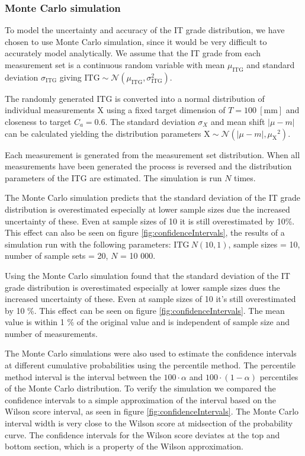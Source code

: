 \documentclass[aip,amsmath, reprint, author-year]{revtex4-1}
\begin{document}
\subsubsection{Monte Carlo simulation}
To model the uncertainty and accuracy of the IT grade distribution, we have chosen to use Monte Carlo simulation, since it would be very difficult to accurately model analytically. We assume that the IT grade from each measurement set is a continuous random variable with mean $\mu_{\mathrm{ITG}}$ and standard deviation $\sigma_{\mathrm{ITG}}$ giving $\mathrm{ITG} \sim \mathcal{N} (\mu_{\mathrm{ITG}}, \sigma_{\mathrm{ITG}}^2)$.

The randomly generated ITG is converted into a normal distribution of individual measurements X using a fixed target dimension of $T = 100 \mathrm{\ [mm]}$ and closeness to target $C_a = 0.6$. 
The standard deviation $\sigma_{X}$ and mean shift $| \mu - m|$ can be calculated yielding the distribution parameters $\mathrm{X} \sim \mathcal{N} (| \mu - m|, {\mu_{\mathrm{X}}}^2)$. 

Each measurement is generated from the measurement set distribution. When all measurements have been generated the process is reversed and the distribution parameters of the ITG are estimated. The simulation is run $N$ times. 

The Monte Carlo simulation predicts that the standard deviation of the IT grade distribution is overestimated especially at lower sample sizes due the increased uncertainty of these. Even at sample sizes of 10 it is still overestimated by 10\%. This effect can also be seen on figure \ref{fig:confidenceIntervals}, the results of a simulation run with the following parameters: $\mathrm{ITG} ~ N (10, 1)$, sample sizes = 10, number of sample sets = 20, $N$ = 10 000.  

Using the Monte Carlo simulation found that the standard deviation of the IT grade distribution is overestimated especially at lower sample sizes dues the increased uncertainty of these. 
Even at sample sizes of 10 it's still overestimated by 10 \%. 
This effect can be seen on figure \ref{fig:confidenceIntervals}. The mean value is within 1 \% of the original value and is independent of sample size and number of measurements.  

The Monte Carlo simulations were also used to estimate the confidence intervals at different cumulative probabilities using the percentile method. The percentile method interval is the interval between the
$ 100 \cdot \alpha$ and $100 \cdot (1- \alpha)$ percentiles of the Monte Carlo distribution.
To verify the simulation we compared the confidence intervals to a simple approximation of the interval based on the Wilson score interval, as seen in figure \ref{fig:confidenceIntervals}. The Monte Carlo interval width is very close to the Wilson score at midsection of the probability curve. The confidence intervals for the Wilson score deviates at the top and bottom section, which is a property of the Wilson approximation.
\end{document}
